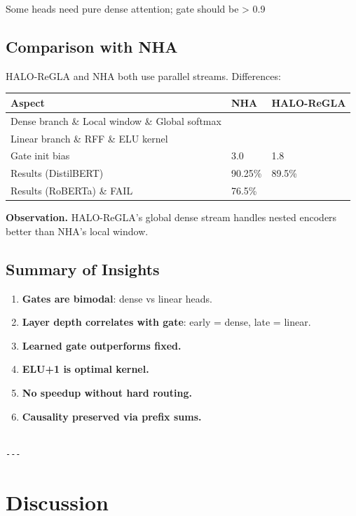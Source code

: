 Some heads need pure dense attention; gate should be > 0.9

\subsection{Comparison with NHA}

HALO-ReGLA and NHA both use parallel streams. Differences:

\begin{table}[H]
\centering
\small
\begin{tabular}{lll}
\toprule
\textbf{Aspect} & \textbf{NHA} & \textbf{HALO-ReGLA} \\
\midrule
Dense branch \& Local window \& Global softmax \\
Linear branch \& RFF \& ELU kernel \\
Gate init bias & 3.0 & 1.8 \\
Results (DistilBERT) & 90.25\% & 89.5\% \\
Results (RoBERTa) \& FAIL & 76.5\% \\
\bottomrule
\end{tabular}
\end{table}

\textbf{Observation.} HALO-ReGLA's global dense stream handles nested encoders 
better than NHA's local window.

\subsection{Summary of Insights}

\begin{enumerate}
\item \textbf{Gates are bimodal}: dense vs linear heads.
\item \textbf{Layer depth correlates with gate}: early = dense, late = linear.
\item \textbf{Learned gate outperforms fixed.}
\item \textbf{ELU+1 is optimal kernel.}
\item \textbf{No speedup without hard routing.}
\item \textbf{Causality preserved via prefix sums.}
\end{enumerate}
\begin{lstlisting}

---
\end{lstlisting}


\section{Discussion}


